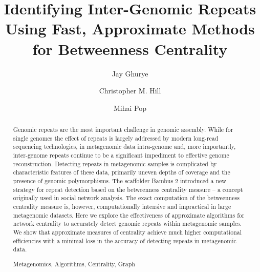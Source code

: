 \documentclass[runningheads,a4paper]{llncs}
\newcommand{\keywords}[1]{\par\addvspace\baselineskip
\noindent\keywordname\enspace\ignorespaces#1}
\begin{document}
\mainmatter  %

\title{Identifying Inter-Genomic Repeats Using Fast, Approximate Methods for Betweenness Centrality}


%
%
\author{Jay Ghurye%
\and Christopher M. Hill\and Mihai Pop}
%


%
%

\maketitle


\begin{abstract}
Genomic repeats are the most important challenge in genomic assembly. While for single genomes the effect of repeats is largely addressed by modern long-read sequencing technologies, in metagenomic data intra-genome and, more importantly, inter-genome repeats continue to be a significant impediment to effective genome reconstruction.  Detecting repeats in metagenomic samples is complicated by characteristic features of these data, primarily uneven depths of coverage and the presence of genomic polymorphisms.  The scaffolder Bambus 2 introduced a new strategy for repeat detection based on the betweenness centrality measure -- a concept originally used in social network analysis. The exact computation of the betweenness centrality measure is, however, computationally intensive and impractical in large metagenomic datasets.  Here we explore the effectiveness of approximate algorithms for network centrality to accurately detect genomic repeats within metagenomic samples.  We show that approximate measures of centrality achieve much higher computational efficiencies with a minimal loss in the accuracy of detecting repeats in metagenomic data.  
\keywords{Metagenomics, Algorithms, Centrality, Graph}
\end{abstract}
\end{document}
